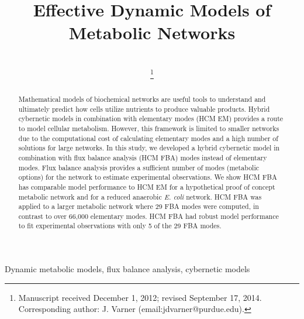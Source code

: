 \documentclass[10pt,twocolumn,twoside,final]{IEEEtran}
\begin{document}
\title{Effective Dynamic Models of Metabolic Networks}


\author{\\
\thanks{Manuscript received December 1, 2012; revised September 17, 2014.
Corresponding author: J. Varner (email:jdvarner@purdue.edu).}}

\maketitle

\begin{abstract}
Mathematical models of biochemical networks are useful tools to understand and ultimately predict how cells utilize nutrients to produce valuable products. 
Hybrid cybernetic models in combination with elementary modes (HCM EM) provides a route to model cellular metabolism. 
However, this framework is limited to smaller networks due to the computational cost of calculating elementary modes and a high number of solutions for large networks.
In this study, we developed a hybrid cybernetic model in combination with flux balance analysis (HCM FBA) modes instead of elementary modes. 
Flux balance analysis provides a sufficient number of modes (metabolic options) for the network to estimate experimental observations.
We show HCM FBA has comparable model performance to HCM EM for a hypothetical proof of concept metabolic network and for a reduced anaerobic \textit{E. coli} network.   
HCM FBA was applied to a larger metabolic network where 29 FBA modes were computed, in contrast to over 66,000 elementary modes. HCM FBA had robust model performance to fit experimental observations with only 5 of the 29 FBA modes.

\end{abstract}


\begin{IEEEkeywords}
Dynamic metabolic models, flux balance analysis, cybernetic models
\end{IEEEkeywords}
\end{document}
